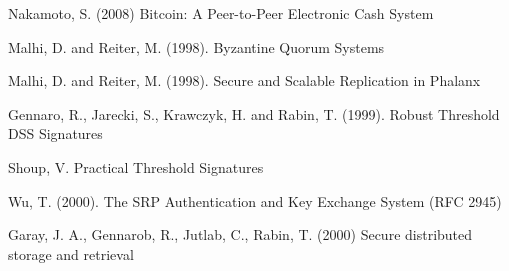 \begin{thebibliography}{99}

  Nakamoto, S. (2008) Bitcoin: A Peer-to-Peer Electronic Cash System

  Malhi, D. and Reiter, M. (1998). Byzantine Quorum Systems

  Malhi, D. and Reiter, M. (1998). Secure and Scalable Replication in Phalanx

  Gennaro, R., Jarecki, S., Krawczyk, H. and Rabin, T. (1999). Robust
  Threshold DSS Signatures

  Shoup, V. Practical Threshold Signatures
  
  Wu, T. (2000). The SRP Authentication and Key Exchange System (RFC
  2945)

  Garay, J. A., Gennarob, R., Jutlab, C., Rabin, T. (2000)  Secure
  distributed storage and retrieval

\end{thebibliography}
